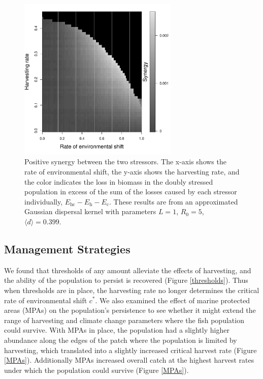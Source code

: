 \documentclass[]{article}
\begin{document}
\begin{figure}[htbp]
\begin{center}
\includegraphics[width=3in]{plots/synergy.pdf}
\caption{Positive synergy between the two stressors.  The x-axis shows the rate of environmental shift, the y-axis shows the harvesting rate, and the color indicates the loss in biomass in the doubly stressed population in excess of the sum of the losses caused by each stressor individually, $E_\text{hc}-E_\text{h}-E_\text{c}$.  These results are from an approximated Gaussian dispersal kernel with parameters $L=1$, $R_0=5$, $\langle d \rangle = 0.399$.}
\label{Synergy}
\end{center}
\end{figure}

\subsection{Management Strategies }

We found that thresholds of any amount alleviate the effects of harvesting, and the ability of the population to 
persist is recovered (Figure \ref{thresholds}). Thus when thresholds are in place, the harvesting rate no longer 
determines the critical rate of environmental shift $c^*$. We also examined the effect of marine protected 
areas (MPAs) on the population's persistence to see whether it might extend the range of harvesting and 
climate change parameters where the fish population could survive. With MPAs in place, the population had a 
slightly higher abundance along the edges of the patch where the population is limited by harvesting, which 
translated into a slightly increased critical harvest rate (Figure \ref{MPAs}). Additionally MPAs increased 
overall catch at the highest harvest rates under which the population could survive (Figure \ref{MPAs}).
\end{document}
